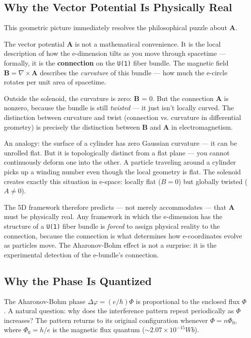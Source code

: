 \documentclass[aps,prd,preprint,superscriptaddress,longbibliography,floatfix]{revtex4-2}
\theoremstyle{remark}
\begin{document}
\subsection{Why the Vector Potential Is Physically Real}

This geometric picture immediately resolves the philosophical puzzle about \textbf{A}.

The vector potential \textbf{A} is not a mathematical convenience. It is the local description of how the e-dimension tilts as you move through spacetime --- formally, it is the \textbf{connection} on the \texttt{U(1)} fiber bundle. The magnetic field $\textbf{B} = \nabla \times \textbf{A}$ describes the \textit{curvature} of this bundle --- how much the e-circle rotates per unit area of spacetime.

Outside the solenoid, the curvature is zero: \textbf{B} = 0. But the connection \textbf{A} is nonzero, because the bundle is still \textit{twisted} --- it just isn't locally curved. The distinction between curvature and twist (connection vs. curvature in differential geometry) is precisely the distinction between \textbf{B} and \textbf{A} in electromagnetism.

An analogy: the surface of a cylinder has zero Gaussian curvature --- it can be unrolled flat. But it is topologically distinct from a flat plane --- you cannot continuously deform one into the other. A particle traveling around a cylinder picks up a winding number even though the local geometry is flat. The solenoid creates exactly this situation in e-space: locally flat ($B = 0$) but globally twisted ($A \neq 0$).

The 5D framework therefore predicts --- not merely accommodates --- that \textbf{A} must be physically real. Any framework in which the e-dimension has the structure of a \texttt{U(1)} fiber bundle is \textit{forced} to assign physical reality to the connection, because the connection is what determines how e-coordinates evolve as particles move. The Aharonov-Bohm effect is not a surprise: it is the experimental detection of the e-bundle's connection.



\subsection{Why the Phase Is Quantized}

The Aharonov-Bohm phase $\Delta\varphi = (e/\hbar)\Phi$ is proportional to the enclosed flux $\Phi$. A natural question: why does the interference pattern repeat periodically as $\Phi$ increases? The pattern returns to its original configuration whenever $\Phi = n\Phi_{0}$, where $\Phi_{0} = h/e$ is the magnetic flux quantum ($\sim 2.07 \times 10^{-15} Wb$).
\end{document}
